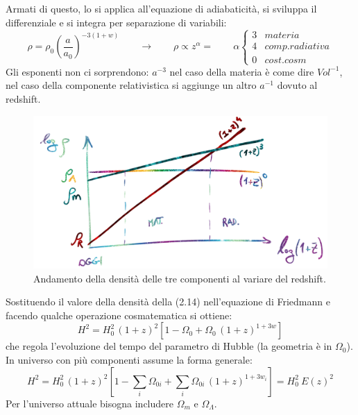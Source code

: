 Armati di questo, lo si applica all'equazione di adiabaticità, si sviluppa il differenziale e si integra per separazione di variabili:
\begin{equation}
    \rho=\rho_0 \left ( \frac{a}{a_0}\right )^{-3(1+w)}\qquad\rightarrow \qquad \rho \propto z^\alpha =\qquad \alpha
\left\{\begin{matrix}
3 & materia\\
4 & comp. radiativa\\
0 & cost. cosm
\end{matrix}\right.
\label{eq:rhoaw} \end{equation}
Gli esponenti non ci sorprendono: $a^{-3}$ nel caso della materia è come dire $Vol^{-1}$, nel caso della componente relativistica si aggiunge un altro $a^{-1}$ dovuto al redshift.

\begin{figure}[h]
    \centering
    \includegraphics[width=.8\textwidth]{Pictures/2/logrho-z.png}
    \caption{Andamento della densità delle tre componenti al variare del redshift.}
    \label{fig:2rhored}
\end{figure}
Sostituendo il valore della densità della (2.14) nell'equazione di Friedmann e facendo qualche operazione cosmatematica si ottiene:
\begin{equation}
    H^2=H_0^2\,(1+z)^2\left [ 1-\Omega_0 + \Omega_0 \,(1+z)^{1+3w} \right ] \label{eq:hevol}
\end{equation}
che regola l'evoluzione del tempo del parametro di Hubble (la geometria è in $\Omega_0$). In universo con più componenti assume la forma generale:
\begin{equation}
    H^2=H_0^2\,(1+z)^2\left [ 1-\sum_{i}\Omega_{0i} + \sum_{i}\Omega_{0i} \,(1+z)^{1+3w_i} \right ] = H_0^2\: E(z)^2 \label{eq:hevolmulti}
\end{equation}
Per l'universo attuale bisogna includere $\Omega_m$ e $\Omega_\Lambda$. 

